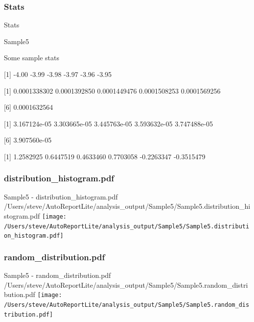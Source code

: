 \documentclass[8pt]{beamer}\usepackage[]{graphicx}\usepackage[]{color}
\begin{document}
\subsubsection{Stats}
\begin{frame}{Stats }
\small{
Sample5 

Some sample stats

[1] -4.00 -3.99 -3.98 -3.97 -3.96 -3.95

[1] 0.0001338302 0.0001392850 0.0001449476 0.0001508253 0.0001569256

[6] 0.0001632564

[1] 3.167124e-05 3.303665e-05 3.445763e-05 3.593632e-05 3.747488e-05

[6] 3.907560e-05

[1]  1.2582925  0.6447519  0.4633460  0.7703058 -0.2263347 -0.3515479
}

\end{frame}

\subsubsection{distribution\_histogram.pdf}
\begin{frame}{Sample5 - distribution\_histogram.pdf }
\scriptsize{/Users/steve/AutoReportLite/analysis\_output/Sample5/Sample5.distribution\_histogram.pdf}
\texttt{[image: /Users/steve/AutoReportLite/analysis\_output/Sample5/Sample5.distribution\_histogram.pdf]}
\end{frame}

\subsubsection{random\_distribution.pdf}
\begin{frame}{Sample5 - random\_distribution.pdf }
\scriptsize{/Users/steve/AutoReportLite/analysis\_output/Sample5/Sample5.random\_distribution.pdf}
\texttt{[image: /Users/steve/AutoReportLite/analysis\_output/Sample5/Sample5.random\_distribution.pdf]}
\end{frame}



\end{document}

